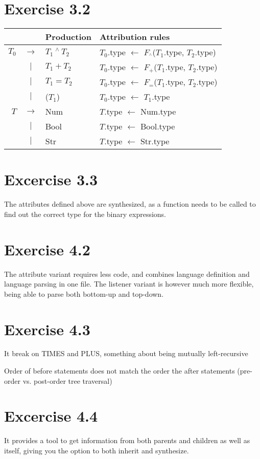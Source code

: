 \documentclass[11pt]{article} %
\begin{document}
\section*{Exercise 3.2}
\noindent
\begin{tabular}{|rcl|l|}
\hline
&& \textbf{Production} & \textbf{Attribution rules} \\\hline
$T_0$ & $\rightarrow$ & $T_1 ~^\wedge ~T_2$ & $T_0$.type $\leftarrow$ $F_{^\wedge}$($T_1$.type, $T_2$.type) \\
& $|$ & $T_1 + T_2$ & $T_0$.type $\leftarrow$ $F_+$($T_1$.type, $T_2$.type) \\
& $|$ & $T_1 = T_2$ & $T_0$.type $\leftarrow$ $F_=$($T_1$.type, $T_2$.type) \\
& $|$ & ($T_1$) & $T_0$.type $\leftarrow$ $T_1$.type \\
$T$ & $\rightarrow$ & Num & $T$.type $\leftarrow$ Num.type \\
& $|$ & Bool & $T$.type $\leftarrow$ Bool.type \\
& $|$ & Str & $T$.type $\leftarrow$ Str.type \\
\hline
\end{tabular}

\section*{Excercise 3.3}

The attributes defined above are synthesized, as a function needs to be called to find out the correct type for the binary expressions.


\section*{Exercise 4.2}
The attribute variant requires less code, and combines language definition and language parsing in one file. The listener variant is however much more flexible, being able to parse both bottom-up and top-down.

\section*{Exercise 4.3}
It break on TIMES and PLUS, something about being mutually left-recursive

Order of before statements does not match the order the after statements (pre-order vs. post-order tree traversal)

\section*{Excercise 4.4}
It provides a tool to get information from both parents and children as well as itself, giving you the option to both inherit and synthesize.
\end{document}
